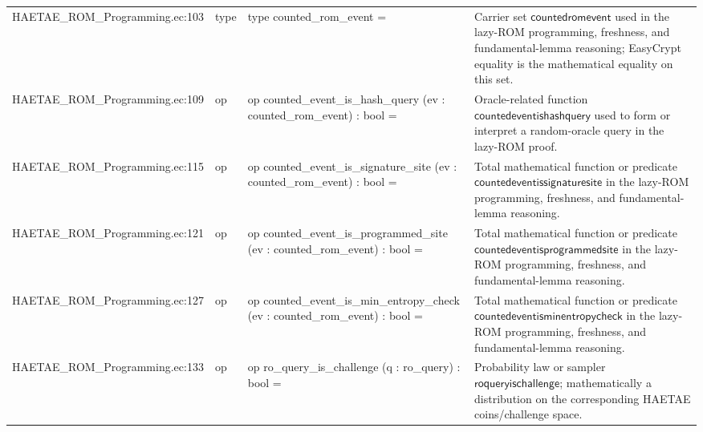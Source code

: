 \documentclass[10pt]{article}
\begin{document}
\begin{longtable}{L{0.11\textwidth}L{0.055\textwidth}L{0.385\textwidth}L{0.41\textwidth}}
HAETAE\_\allowbreak{}ROM\_\allowbreak{}Programming.\allowbreak{}ec:\allowbreak{}103 & type & {\ttfamily\scriptsize type counted\_\allowbreak{}rom\_\allowbreak{}event =} & Carrier set $\mathsf{countedromevent}$ used in the lazy-ROM programming, freshness, and fundamental-lemma reasoning; EasyCrypt equality is the mathematical equality on this set. \\
HAETAE\_\allowbreak{}ROM\_\allowbreak{}Programming.\allowbreak{}ec:\allowbreak{}109 & op & {\ttfamily\scriptsize op counted\_\allowbreak{}event\_\allowbreak{}is\_\allowbreak{}hash\_\allowbreak{}query (ev : counted\_\allowbreak{}rom\_\allowbreak{}event) : bool =} & Oracle-related function $\mathsf{countedeventishashquery}$ used to form or interpret a random-oracle query in the lazy-ROM proof. \\
HAETAE\_\allowbreak{}ROM\_\allowbreak{}Programming.\allowbreak{}ec:\allowbreak{}115 & op & {\ttfamily\scriptsize op counted\_\allowbreak{}event\_\allowbreak{}is\_\allowbreak{}signature\_\allowbreak{}site (ev : counted\_\allowbreak{}rom\_\allowbreak{}event) : bool =} & Total mathematical function or predicate $\mathsf{countedeventissignaturesite}$ in the lazy-ROM programming, freshness, and fundamental-lemma reasoning. \\
HAETAE\_\allowbreak{}ROM\_\allowbreak{}Programming.\allowbreak{}ec:\allowbreak{}121 & op & {\ttfamily\scriptsize op counted\_\allowbreak{}event\_\allowbreak{}is\_\allowbreak{}programmed\_\allowbreak{}site (ev : counted\_\allowbreak{}rom\_\allowbreak{}event) : bool =} & Total mathematical function or predicate $\mathsf{countedeventisprogrammedsite}$ in the lazy-ROM programming, freshness, and fundamental-lemma reasoning. \\
HAETAE\_\allowbreak{}ROM\_\allowbreak{}Programming.\allowbreak{}ec:\allowbreak{}127 & op & {\ttfamily\scriptsize op counted\_\allowbreak{}event\_\allowbreak{}is\_\allowbreak{}min\_\allowbreak{}entropy\_\allowbreak{}check (ev : counted\_\allowbreak{}rom\_\allowbreak{}event) : bool =} & Total mathematical function or predicate $\mathsf{countedeventisminentropycheck}$ in the lazy-ROM programming, freshness, and fundamental-lemma reasoning. \\
HAETAE\_\allowbreak{}ROM\_\allowbreak{}Programming.\allowbreak{}ec:\allowbreak{}133 & op & {\ttfamily\scriptsize op ro\_\allowbreak{}query\_\allowbreak{}is\_\allowbreak{}challenge (q : ro\_\allowbreak{}query) : bool =} & Probability law or sampler $\mathsf{roqueryischallenge}$; mathematically a distribution on the corresponding HAETAE coins/challenge space. \\

\end{longtable}
\end{document}
